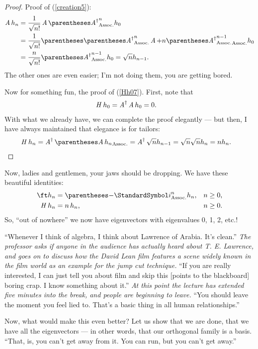 \documentclass[10pt, a4paper, twoside]{lecturenotes}
\newcommand{\opAdag}{\adj{\opA}}
\begin{document}
\begin{lecture}[date=2013-03-28]
\begin{proposition}
\begin{proof}
  Proof of (\ref{creation5}):
  \begin{align*}
  \opA h_n &= \frac{1}{\sqrt{\Factorial n}} \opA\pa{\opAdag}^n h_0 \\
  &= \frac{1}{\sqrt{\Factorial n}}\pa{\pa{\opAdag}^n\opA + n \pa{\opAdag}^{n-1}}h_0\\
  &= \frac{n}{\sqrt{\Factorial n}} \pa{\opAdag}^{n-1} h_0 = \sqrt{n} h_{n-1}\text.
  \end{align*}
  The other ones are even easier; I'm not doing them, you are getting bored.

  Now for something fun, the proof of (\ref{Hh07}). First, note that
  \begin{align*}
    \opH h_0 &= \opAdag \opA h_0 = 0\text.
  \end{align*}
  With what we already have, we can complete the proof elegantly --- but then, I have always maintained that elegance is for tailors:
 \begin{align*}
   \opH h_n &= \opAdag \pa{\opA h_n} = \opAdag \sqrt{n} h_{n-1} = \sqrt{n} \sqrt{n} h_n = n h_n\text.
 \end{align*}
\end{proof}
\end{proposition}
Now, ladies and gentlemen, your jaws should be dropping. We have these beautiful identities:
\begin{align*}
  \ft h_n &= \pa{-\I}^n h_n \text, && n \geq 0 \text,\\
  \opH h_n &= n\, h_n\text, && n \geq 0 \text.
\end{align*}
So, ``out of nowhere'' we now have eigenvectors with eigenvalues 0, 1, 2, etc.!

``Whenever I think of algebra, I think about Lawrence of Arabia. It's clean.'' \emph{The professor asks if anyone in the audience has actually heard about T. E. Lawrence, and goes on to discuss how the David Lean film features a scene widely known in the film world as an example for the jump cut technique.} ``If you are really interested, I can just tell you about film and skip this [points to the blackboard] boring crap. I know something about it.'' \emph{At this point the lecture has extended five minutes into the break, and people are beginning to leave.}
``You should leave the moment you feel lied to. That's a basic thing in all human relationships.''

Now, what would make this even better? Let us show that we are done, that we have all the eigenvectors --- in other words, that our orthogonal family is a basis. ``That, is, you can't get away from it. You can run, but you can't get away.''


\end{lecture}
\end{document}
